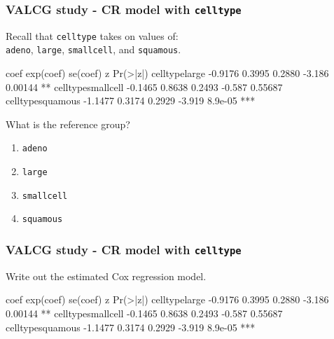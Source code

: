 \begin{frame}[fragile]
\frametitle{VALCG study - CR model with \texttt{celltype}}
Recall that \texttt{celltype} takes on values of: \\ 
\texttt{adeno}, \texttt{large}, \texttt{smallcell}, and \texttt{squamous}. 
\begin{Rout}{-.05}
                     coef exp(coef) se(coef)      z Pr(>|z|)
celltypelarge     -0.9176    0.3995   0.2880 -3.186  0.00144 **
celltypesmallcell -0.1465    0.8638   0.2493 -0.587  0.55687
celltypesquamous  -1.1477    0.3174   0.2929 -3.919  8.9e-05 ***
\end{Rout}
\begin{clicker}{What is the reference group?}
\begin{enumerate}
\item \texttt{adeno}
\item \texttt{large}
\item \texttt{smallcell}
\item \texttt{squamous}
\end{enumerate}
\end{clicker}
\end{frame}

\begin{frame}[fragile]
\frametitle{VALCG study - CR model with \texttt{celltype}}
Write out the estimated Cox regression model.
\begin{Rout}{-.05}
                     coef exp(coef) se(coef)      z Pr(>|z|)
celltypelarge     -0.9176    0.3995   0.2880 -3.186  0.00144 **
celltypesmallcell -0.1465    0.8638   0.2493 -0.587  0.55687
celltypesquamous  -1.1477    0.3174   0.2929 -3.919  8.9e-05 ***
\end{Rout}
\vskip200pt
\end{frame}

